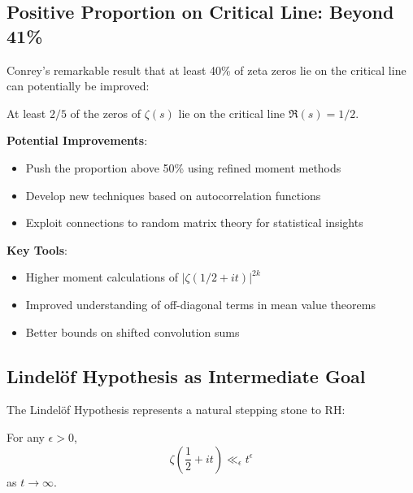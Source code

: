 \subsection{Positive Proportion on Critical Line: Beyond 41\%}
\label{subsec:positive_proportion}

Conrey's remarkable result that at least 40\% of zeta zeros lie on the critical line can potentially be improved:

\begin{theorem}[Conrey 1989]
At least $2/5$ of the zeros of $\zeta(s)$ lie on the critical line $\Re(s) = 1/2$.
\end{theorem}

\begin{research_direction}
\textbf{Potential Improvements}:
\begin{itemize}
\item Push the proportion above 50\% using refined moment methods
\item Develop new techniques based on autocorrelation functions
\item Exploit connections to random matrix theory for statistical insights
\end{itemize}

\textbf{Key Tools}:
\begin{itemize}
\item Higher moment calculations of $|\zeta(1/2 + it)|^{2k}$
\item Improved understanding of off-diagonal terms in mean value theorems
\item Better bounds on shifted convolution sums
\end{itemize}
\end{research_direction}

\subsection{Lindelöf Hypothesis as Intermediate Goal}
\label{subsec:lindelof_intermediate}

The Lindelöf Hypothesis represents a natural stepping stone to RH:

\begin{conjecture}
For any $\epsilon > 0$,
\begin{equation}
\zeta\left(\frac{1}{2} + it\right) \ll_\epsilon t^\epsilon
\end{equation}
as $t \to \infty$.
\end{conjecture}


